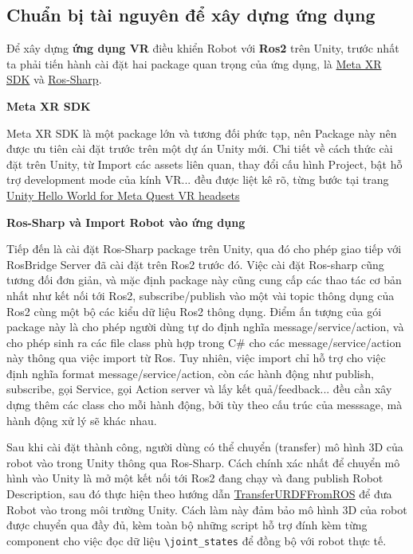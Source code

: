 \subsection{Chuẩn bị tài nguyên để xây dựng ứng dụng}

Để xây dựng \textbf{ứng dụng VR} điều khiển Robot với\textbf{ Ros2} trên Unity, trước nhất ta phải tiến hành cài đặt hai package quan trọng của ứng dụng, là \href{https://developers.meta.com/horizon/downloads/package/meta-xr-sdk-all-in-one-upm/}{Meta XR SDK} và \href{https://github.com/siemens/ros-sharp}{Ros-Sharp}.

\textbf{Meta XR SDK}

Meta XR SDK là một package lớn và tương đối phức tạp, nên Package này nên được ưu tiên cài đặt trước trên một dự án Unity mới. Chi tiết về cách thức cài đặt trên Unity, từ Import các assets liên quan, thay đổi cấu hình Project, bật hỗ trợ development mode của kính VR... đều được liệt kê rõ, từng bước tại trang \href{https://developers.meta.com/horizon/documentation/unity/unity-tutorial-hello-vr/}{Unity Hello World for Meta Quest VR headsets}

\textbf{Ros-Sharp và Import Robot vào ứng dụng}

Tiếp đến là cài đặt Ros-Sharp package trên Unity, qua đó cho phép giao tiếp với RosBridge Server đã cài đặt trên Ros2 trước đó. Việc cài đặt Ros-sharp cũng tương đối đơn giản, và mặc định package này cũng cung cấp các thao tác cơ bản nhất như kết nối tới Ros2, subscribe/publish vào một vài topic thông dụng của Ros2 cùng một bộ các kiểu dữ liệu Ros2 thông dụng. Điểm ấn tượng của gói package này là cho phép người dùng tự do định nghĩa message/service/action, và cho phép sinh ra các file class phù hợp trong C\# cho các message/service/action này thông qua việc import từ Ros. Tuy nhiên, việc import chỉ hỗ trợ cho việc định nghĩa format message/service/action, còn các hành động như publish, subscribe, gọi Service, gọi Action server và lấy kết quả/feedback... đều cần xây dựng thêm các class cho mỗi hành động, bởi tùy theo cấu trúc của messsage, mà hành động xử lý sẽ khác nhau.

Sau khi cài đặt thành công, người dùng có thể chuyển (transfer) mô hình 3D của robot vào trong Unity thông qua Ros-Sharp. Cách chính xác nhất để chuyển mô hình vào Unity là mở một kết nối tới Ros2 đang chạy và đang publish Robot Description, sau đó thực hiện theo hướng dẫn \href{https://github.com/siemens/ros-sharp/wiki/User_App_ROS_TransferURDFFromROS}{TransferURDFFromROS} để đưa Robot vào trong môi trường Unity. Cách làm này đảm bảo mô hình 3D của robot được chuyển qua đầy đủ, kèm toàn bộ những script hỗ trợ đính kèm từng component cho việc đọc dữ liệu \lstinline[style=inlinecode]{\joint_states} để đồng bộ với robot thực tế.

